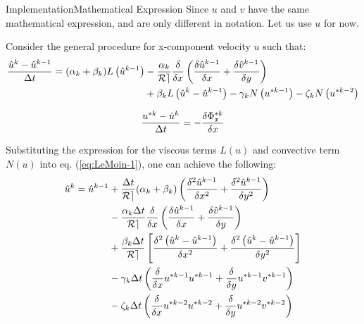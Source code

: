 \documentclass[\string~/GitHub/sthlmNordBeamerTheme/sthlmNordLightDemo.tex]{subfiles}
\begin{document}
    
    \begin{frame}{Implementation}{Mathematical Expression}
        \remarks Since $u$ and $v$ have the same mathematical expression, and are only different in notation. Let us use $u$ for now.
        
        Consider the general procedure for x-component velocity $u$ such that: \begin{equation}
            \begin{split}
                \frac{\Hat{u}^k - \Hat{u}^{k-1}}{\Delta t} = (\alpha_k + \beta_k) L \left( \Hat{u}^{k-1} \right) &- \frac{\alpha_k}{\mathcal{Re}} \frac{\delta}{\delta x} \left( \frac{\delta \Hat{u}^{k-1}}{\delta x} + \frac{\delta \Hat{v}^{k-1}}{\delta y}  \right) \\
                &+ \beta_k L \left( \Hat{u}^k - \Hat{u}^{k-1} \right) - \gamma_k N \left( u^{* k-1} \right) - \zeta_k N \left( u^{* k-2} \right)
            \end{split}
            \label{eq:LeMoin-1}
        \end{equation}

        \begin{equation}
            \frac{u^{*k} - \Hat{u}^k}{\Delta t} = - \frac{\delta \Phi^{*k}_x}{\delta x}
            \label{eq:LeMoin-2}
        \end{equation}

        \framebreak

        Substituting the expression for the viscous terms $L(u)$ and convective term $N(u)$ into eq. (\ref{eq:LeMoin-1}), one can achieve the following:
        \begin{equation}
            \begin{split}
                \Hat{u}^k = \Hat{u}^{k-1} &+ \frac{\Delta t}{\mathcal{Re}} (\alpha_k + \beta_k) \left( \frac{\delta^2 \Hat{u}^{k-1}}{\delta x^2} + \frac{\delta^2 \Hat{u}^{k-1}}{\delta y^2} \right) \\
                    &- \frac{\alpha_k \Delta t }{\mathcal{Re}} \frac{\delta}{\delta x} \left( \frac{\delta \Hat{u}^{k-1}}{\delta x} + \frac{\delta \Hat{v}^{k-1}}{\delta y}  \right) \\
                    &+ \frac{\beta_k \Delta t }{\mathcal{Re}} \left[ \frac{\delta^2 \left( \Hat{u}^k - \Hat{u}^{k-1} \right)}{\delta x^2} + \frac{\delta^2 \left( \Hat{u}^k - \Hat{u}^{k-1} \right)}{\delta y^2} \right] \\
                    &- \gamma_k \Delta t  \left( \frac{\delta }{\delta x} u^{* k-1} u^{* k-1} + \frac{\delta }{\delta y} u^{* k-1} v^{* k-1} \right) \\
                    &- \zeta_k \Delta t  \left( \frac{\delta }{\delta x} u^{* k-2} u^{* k-2} + \frac{\delta }{\delta y} u^{* k-2} v^{* k-2} \right) 
            \end{split}
        \end{equation}
        
    \end{frame}
    
\end{document}
